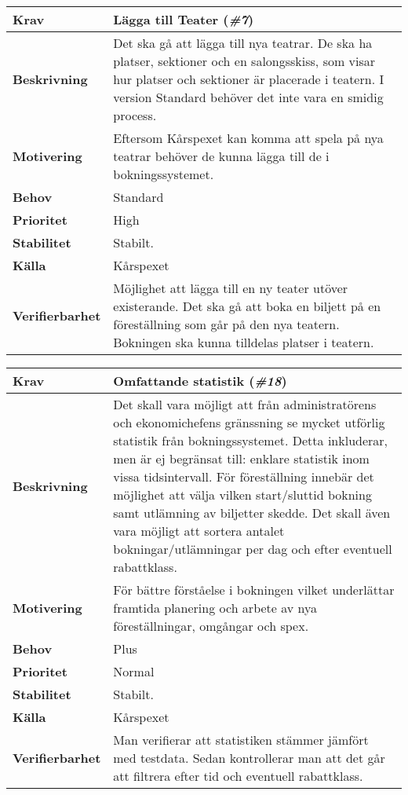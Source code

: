 \documentclass[a4paper, twoside, 11pt, titlepage]{article}
\begin{document}
		\begin{tabular} { p{2.6cm} p{12.5cm} }
			\hline
			\sffamily\textbf{Krav} & Lägga till Teater (\emph{\#7})  \\
			\hline
			\sffamily\textbf{Beskrivning} & Det ska gå att lägga till nya teatrar. De ska ha platser, sektioner och en salongsskiss, som visar hur platser och sektioner är placerade i teatern. I version Standard behöver det inte vara en smidig process.  \\
			\hline
			\sffamily\textbf{Motivering} & Eftersom Kårspexet kan komma att spela på nya teatrar behöver de kunna lägga till de i bokningssystemet.  \\
			\hline
			\sffamily\textbf{Behov} & Standard  \\
			\hline
			\sffamily\textbf{Prioritet} & High  \\
			\hline
			\sffamily\textbf{Stabilitet} & Stabilt.  \\
			\hline
			\sffamily\textbf{Källa} & Kårspexet  \\
			\hline
			\sffamily\textbf{Verifierbarhet} & Möjlighet att lägga till en ny teater utöver existerande. Det ska gå att boka en biljett på en föreställning som går på den nya teatern. Bokningen ska kunna tilldelas platser i teatern.  \\
			\hline
		\end{tabular}
		\vspace{6mm}

		\begin{tabular} { p{2.6cm} p{12.5cm} }
			\hline
			\sffamily\textbf{Krav} & Omfattande statistik (\emph{\#18})  \\
			\hline
			\sffamily\textbf{Beskrivning} & Det skall vara möjligt att från administratörens och ekonomichefens gränssning se mycket utförlig statistik från bokningssystemet. Detta inkluderar, men är ej begränsat till: enklare statistik inom vissa tidsintervall. För föreställning innebär det möjlighet att välja vilken start/sluttid bokning samt utlämning av biljetter skedde. Det skall även vara möjligt att sortera antalet bokningar/utlämningar per dag och efter eventuell rabattklass.  \\
			\hline
			\sffamily\textbf{Motivering} & För bättre förståelse i bokningen vilket underlättar framtida planering och arbete av nya föreställningar, omgångar och spex.  \\
			\hline
			\sffamily\textbf{Behov} & Plus  \\
			\hline
			\sffamily\textbf{Prioritet} & Normal  \\
			\hline
			\sffamily\textbf{Stabilitet} & Stabilt.  \\
			\hline
			\sffamily\textbf{Källa} & Kårspexet  \\
			\hline
			\sffamily\textbf{Verifierbarhet} & Man verifierar att statistiken stämmer jämfört med testdata. Sedan kontrollerar man att det går att filtrera efter tid och eventuell rabattklass.  \\
			\hline
		\end{tabular}
		\vspace{6mm}
\end{document}
